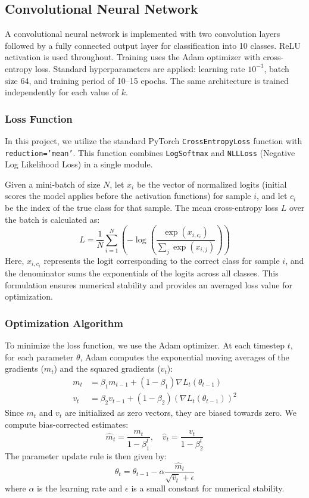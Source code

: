 \documentclass[11pt]{article}
\begin{document}
\subsection*{Convolutional Neural Network}
A convolutional neural network is implemented with two convolution layers followed by a fully connected output layer for classification into 10 classes. ReLU activation is used throughout. Training uses the Adam optimizer with cross-entropy loss. Standard hyperparameters are applied: learning rate \(10^{-3}\), batch size 64, and training period of 10–15 epochs. The same architecture is trained independently for each value of \(k\).


\subsubsection*{Loss Function}
In this project, we utilize the standard PyTorch \texttt{CrossEntropyLoss} function with \texttt{reduction='mean'}. This function combines \texttt{LogSoftmax} and \texttt{NLLLoss} (Negative Log Likelihood Loss) in a single module. 

Given a mini-batch of size \(N\), let \(x_i\) be the vector of normalized logits (initial scores the model applies before the activation functions)  for sample \(i\), and let \(c_i\) be the index of the true class for that sample. The mean cross-entropy loss \(L\) over the batch is calculated as:
\[
L = \frac{1}{N} \sum_{i=1}^{N} \left( - \log \left( \frac{\exp(x_{i, c_i})}{\sum_{j} \exp(x_{i, j})} \right) \right)
\]
Here, \(x_{i, c_i}\) represents the logit corresponding to the correct class for sample \(i\), and the denominator sums the exponentials of the logits across all classes. This formulation ensures numerical stability and provides an averaged loss value for optimization.

\subsubsection*{Optimization Algorithm}
To minimize the loss function, we use the Adam optimizer. At each timestep \(t\), for each parameter \(\theta\), Adam computes the exponential moving averages of the gradients (\(m_t\)) and the squared gradients (\(v_t\)):
\begin{align*}
m_t &= \beta_1 m_{t-1} + (1 - \beta_1) \nabla L_t(\theta_{t-1}) \\
v_t &= \beta_2 v_{t-1} + (1 - \beta_2) (\nabla L_t(\theta_{t-1}))^2
\end{align*}
Since \(m_t\) and \(v_t\) are initialized as zero vectors, they are biased towards zero. We compute bias-corrected estimates:
\[
\hat{m}_t = \frac{m_t}{1 - \beta_1^t}, \quad \hat{v}_t = \frac{v_t}{1 - \beta_2^t}
\]
The parameter update rule is then given by:
\[
\theta_t = \theta_{t-1} - \alpha \frac{\hat{m}_t}{\sqrt{\hat{v}_t} + \epsilon}
\]
where \(\alpha\) is the learning rate and \(\epsilon\) is a small constant for numerical stability.
\end{document}
